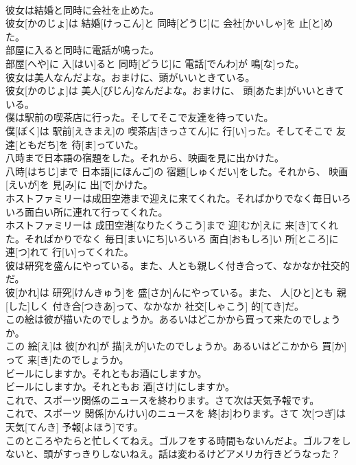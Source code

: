 \documentclass[8pt]{extreport}
\begin{document}
\begin{CJK}{UTF8}{min}
\\	彼女は結婚と同時に会社を止めた。	
\\	彼女[かのじょ]は 結婚[けっこん]と 同時[どうじ]に 会社[かいしゃ]を 止[と]めた。
\\	部屋に入ると同時に電話が鳴った。	
\\	部屋[へや]に 入[はい]ると 同時[どうじ]に 電話[でんわ]が 鳴[な]った。
\\	彼女は美人なんだよな。おまけに、頭がいいときている。	
\\	彼女[かのじょ]は 美人[びじん]なんだよな。おまけに、 頭[あたま]がいいときている。
\\	僕は駅前の喫茶店に行った。そしてそこで友達を待っていた。	
\\	僕[ぼく]は 駅前[えきまえ]の 喫茶店[きっさてん]に 行[い]った。そしてそこで 友達[ともだち]を 待[ま]っていた。
\\	八時まで日本語の宿題をした。それから、映画を見に出かけた。	
\\	八時[はちじ]まで 日本語[にほんご]の 宿題[しゅくだい]をした。それから、 映画[えいが]を 見[み]に 出[で]かけた。
\\	ホストファミリーは成田空港まで迎えに来てくれた。そればかりでなく毎日いろいろ面白い所に連れて行ってくれた。	
\\	ホストファミリーは 成田空港[なりたくうこう]まで 迎[むか]えに 来[き]てくれた。そればかりでなく 毎日[まいにち]いろいろ 面白[おもしろ]い 所[ところ]に 連[つ]れて 行[い]ってくれた。
\\	彼は研究を盛んにやっている。また、人とも親しく付き合って、なかなか社交的だ。	
\\	彼[かれ]は 研究[けんきゅう]を 盛[さか]んにやっている。また、 人[ひと]とも 親[した]しく 付き合[つきあ]って、なかなか 社交[しゃこう] 的[てき]だ。
\\	この絵は彼が描いたのでしょうか。あるいはどこかから買って来たのでしょうか。	
\\	この 絵[え]は 彼[かれ]が 描[えが]いたのでしょうか。あるいはどこかから 買[か]って 来[き]たのでしょうか。
\\	ビールにしますか。それともお酒にしますか。	
\\	ビールにしますか。それともお 酒[さけ]にしますか。
\\	これで、スポーツ関係のニュースを終わります。さて次は天気予報です。	
\\	これで、スポーツ 関係[かんけい]のニュースを 終[お]わります。さて 次[つぎ]は 天気[てんき] 予報[よほう]です。
\\	このところやたらと忙しくてねえ。ゴルフをする時間もないんだよ。ゴルフをしないと、頭がすっきりしないねえ。話は変わるけどアメリカ行きどうなった？	

\end{CJK}
\end{document}
